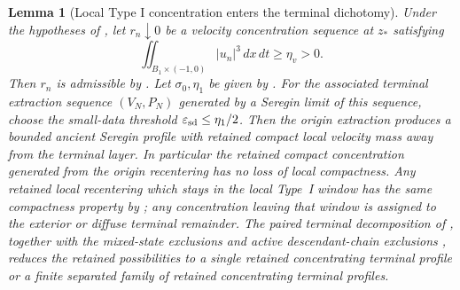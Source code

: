 \documentclass[11pt]{amsart}
\numberwithin{equation}{section}
\theoremstyle{plain}
\newtheorem{lemma}[theorem]{Lemma}
\theoremstyle{definition}
\theoremstyle{remark}
\newcommand{\eps}{\varepsilon}
\begin{document}
\begin{lemma}[Local Type I concentration enters the terminal dichotomy]
\label{lem:local-typeI-into-terminal-dichotomy}
Under the hypotheses of
, let \(r_n\downarrow0\) be a
velocity concentration sequence at \(z_*\) satisfying
\[
   \iint_{B_1\times(-1,0)} |u_n|^3\,dx\,dt\ge\eta_v>0 .
\]
Then \(r_n\) is admissible by .  Let
\(\sigma_0,\eta_1\) be given by
.
For the associated terminal extraction sequence \((V_N,P_N)\) generated by a
Seregin limit of this sequence, choose the small-data threshold
\(\eps_{\rm sd}\le\eta_1/2\).  Then the origin extraction produces a bounded
ancient Seregin profile with retained compact local velocity mass away from the
terminal layer.  In particular the retained compact concentration generated
from the origin recentering has no loss of local compactness.  Any retained
local recentering which stays in the local Type~I window has the same compactness
property by ; any concentration
leaving that window is assigned to the exterior or diffuse terminal remainder.
The paired terminal decomposition of ,
together with the mixed-state exclusions and active descendant-chain exclusions
, reduces the
retained possibilities to a single retained concentrating terminal profile or a
finite separated family of retained concentrating terminal profiles.
\end{lemma}
\end{document}
